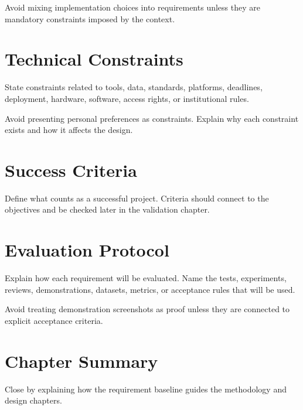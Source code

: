 Avoid mixing implementation choices into requirements unless they are mandatory constraints imposed by the context.

\section{Technical Constraints}
State constraints related to tools, data, standards, platforms, deadlines, deployment, hardware, software, access rights, or institutional rules.

Avoid presenting personal preferences as constraints. Explain why each constraint exists and how it affects the design.

\section{Success Criteria}
Define what counts as a successful project. Criteria should connect to the objectives and be checked later in the validation chapter.

\section{Evaluation Protocol}
Explain how each requirement will be evaluated. Name the tests, experiments, reviews, demonstrations, datasets, metrics, or acceptance rules that will be used.


Avoid treating demonstration screenshots as proof unless they are connected to explicit acceptance criteria.

\section{Chapter Summary}
Close by explaining how the requirement baseline guides the methodology and design chapters.